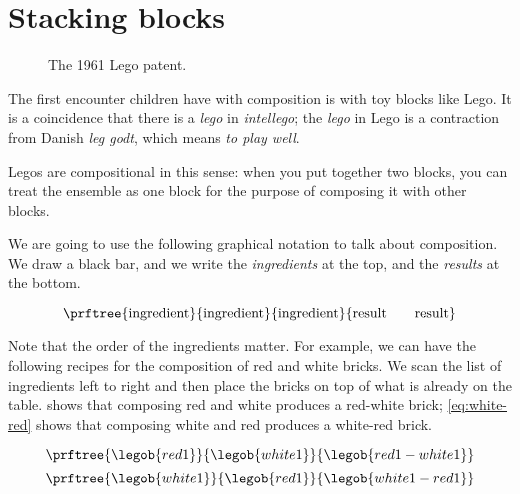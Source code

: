 


\section{Stacking blocks}

\begin{figure*}[p]
  \centering
%
  \caption{The 1961 Lego patent.}
\end{figure*}


The first encounter children have with composition is with toy blocks like Lego. It is a coincidence that there is a \emph{lego} in \emph{intellego}; the \emph{lego} in Lego is a contraction from Danish \emph{leg godt}, which means \emph{to play well}.

Legos are compositional in this sense: when you put together two blocks, you can treat the ensemble as one block for the purpose of composing it with other blocks.

We are going to use the following graphical notation to talk about composition.
We draw a black bar, and we write the \emph{ingredients} at the top, and the \emph{results} at the bottom.

\begin{equation}
\prftree{
    \text{ingredient}
}{
    \text{ingredient}
}{
    \text{ingredient}
}{
    \text{result} \quad \quad \text{result}
}
\end{equation}

Note that the order of the ingredients matter.
For example, we can have the following recipes for the composition of red and white bricks.
We scan the list of ingredients left to right and then place the bricks on top of what is already on the table.
 shows that composing red and white produces a red-white brick;
\cref{eq:white-red} shows that composing white and red produces a white-red brick.

\begin{equation}\label{eq:red-white}
\prftree{\legob{red1}}{\legob{white1}}{\legob{red1-white1}}
\end{equation}
%
\begin{equation}\label{eq:white-red}
\prftree{\legob{white1}}{\legob{red1}}{\legob{white1-red1}}
\end{equation}

